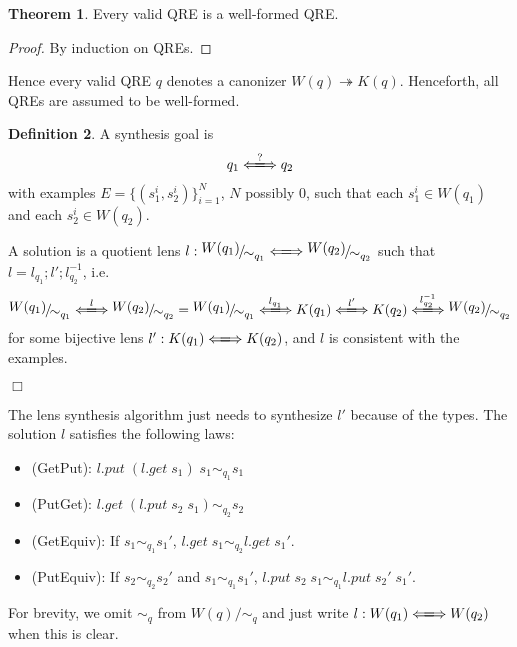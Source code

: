 \documentclass[a4paper,11pt] {article}
\theoremstyle{definition}
\newtheorem{theorem}{Theorem}[section]
\newtheorem{definition}[theorem]{Definition}
\newcommand{\lget}[1]{\textit{$#1$.get}}
\newcommand{\lput}[1]{\textit{$#1$.put}}
\newcommand{\lcreate}[1]{\textit{$#1$.create}}
\newcommand{\canon}{\twoheadrightarrow}
\newcommand{\lensbetween}[1]{\xLongleftrightarrow{#1}}
\newcommand{\name}[1]{\textsf{#1}}
\newcommand{\niceFrac}[2]{%
    \raise.5ex\hbox{$#1$}%
    \kern-.1em/\kern-.15em%
    \lower.25ex\hbox{$#2$}}
\begin{document}
\begin{theorem}
  Every valid QRE is a well-formed QRE.
\end{theorem}
\begin{proof}
  By induction on QREs.
\end{proof}
Hence every valid QRE $q$ denotes a canonizer $W(q) \canon K(q)$.
Henceforth, all QREs are assumed to be well-formed.
\begin{definition}
  A synthesis goal is 
  \begin{align*}
    q_1 \lensbetween{?} q_2
  \end{align*}
  with examples
  $E = \{(s_1^i, s_2^i)\}_{i=1}^N$, $N$ possibly $0$,
  such that each $s_1^i \in W(q_1)$ and each $s_2^i \in W(q_2)$.
  
  A solution is a quotient lens
  $l: \niceFrac{W(q_1)}{\sim_{q_1}} \lensbetween{} \niceFrac{W(q_2)}{\sim_{q_2}}$
  such that $l = l_{q_1} ; l' ; l_{q_2}^{-1}$, i.e.
  \begin{align*}
    \niceFrac{W(q_1)}{\sim_{q_1}} \lensbetween{l} \niceFrac{W(q_2)}{\sim_{q_2}}
    = \niceFrac{W(q_1)}{\sim_{q_1}} \lensbetween{l_{q_1}} K(q_1) \lensbetween{l'} K(q_2)
    \lensbetween{l_{q_2}^{-1}} \niceFrac{W(q_2)}{\sim_{q_2}}
  \end{align*}
  for some bijective lens
  $l': K(q_1) \lensbetween{} K(q_2)$, and 
  $l$ is consistent with the examples.
  \begin{flushright} $\Box$ \end{flushright}
\end{definition}
The lens synthesis algorithm just needs to synthesize $l'$
because of the types. The solution $l$ satisfies the following laws:
\begin{itemize}
\item (\name{GetPut}): $\lput{l} \; (\lget{l} \; s_1) \; s_1 \sim_{q_1} s_1$ 
\item (\name{PutGet}): $\lget{l} \; (\lput{l} \; s_2 \; s_1) \sim_{q_2} s_2$
\item (\name{GetEquiv}): If $s_1 \sim_{q_1} s_1'$, $\lget{l} \; s_1
  \sim_{q_2} \lget{l} \; s_1'$.
\item (\name{PutEquiv}): If $s_2 \sim_{q_2} s_2'$ and $s_1 \sim_{q_1} s_1'$,
  $\lput{l} \; s_2 \; s_1 \sim_{q_1} \lput{l} \; s_2' \; s_1'$.
\end{itemize}
For brevity, we omit $\sim_{q}$ from $W(q)/\sim_{q}$ and just write
$l: W(q_1) \lensbetween{} W(q_2)$ when this is clear.
\end{document}
